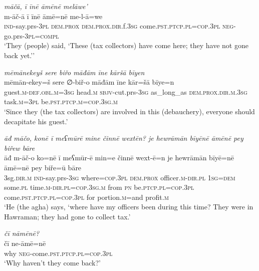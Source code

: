 \ea \label{BP.47}
\textit{māčā, ī īnē āmēnē melāwe’} \\ 
\gll m-āč-ā ī īnē āmē=nē me-l-ā=we \\ 
 \textsc{ind-}say.prs\textsc{-3pl} \textsc{dem.prox} \textsc{dem.prox}\textsc{.dir}.f\textsc{.3sg} come\textsc{.pst}\textsc{.ptcp}\textsc{.pl}\textsc{=cop}\textsc{.3pl} \textsc{neg-}go.prs\textsc{-3pl}\textsc{=compl} \\ 
\glt `They (people) said, ‘These (tax collectors) have come here; they have not gone back yet.’'
\z 
 
\ea \label{BP.53}
\textit{mēmānekeyš sere biřo māđām īne kāršā bīyen} \\ 
\gll mēmān-ekey=š sere ∅-biř-o māđām īne kār=šā bīye=n \\ 
 guest\textsc{.m}\textsc{-def}\textsc{.obl}\textsc{.m}\textsc{=3sg} head\textsc{.m} \textsc{sbjv-}cut.prs\textsc{-3sg} as\_long\_as \textsc{dem.prox}\textsc{.dir}\textsc{.m}\textsc{.3sg} task\textsc{.m}\textsc{=3pl} be\textsc{.pst}\textsc{.ptcp}\textsc{.m}\textsc{=cop}\textsc{.3sg}\textsc{.m} \\ 
\glt `Since they (the tax collectors) are involved in this (debauchery), everyone should decapitate his guest.'
\z 
 
\ea \label{BP.57}
\textit{āđ māčo, konē ī meʕmūrē mine činnē wextēn? je hewrāmān bīyēnē āmēnē pey biřew bāre} \\ 
\gll āđ m-āč-o ko=nē ī meʕmūr-ē min=e činnē wext-ē=n je hewrāmān bīyē=nē āmē=nē pey biře=ū bāre \\ 
 3sg\textsc{.dir}\textsc{.m} \textsc{ind-}say.prs\textsc{-3sg} where\textsc{=cop}\textsc{.3pl} \textsc{dem.prox} officer\textsc{.m}\textsc{-dir}\textsc{.pl} \textsc{1sg}\textsc{=dem} some\textsc{.pl} time\textsc{.m}\textsc{-dir}\textsc{.pl}\textsc{=cop}\textsc{.3sg}\textsc{.m} from \textsc{pn} be\textsc{.ptcp}\textsc{.pl}\textsc{=cop}\textsc{.3pl} come\textsc{.pst}\textsc{.ptcp}\textsc{.pl}\textsc{=cop}\textsc{.3pl} for portion\textsc{.m}=and profit\textsc{.m} \\ 
\glt `He (the agha) says, ‘where have my officers been during this time? They were in Hawraman; they had gone to collect tax.'
\z 
 
\ea \label{BP.59}
\textit{čī nāmēnē?} \\ 
\gll čī ne-āmē=nē \\ 
 why \textsc{neg-}come\textsc{.pst}\textsc{.ptcp}\textsc{.pl}\textsc{=cop}\textsc{.3pl} \\ 
\glt `Why haven’t they come back?'
\z 
 
